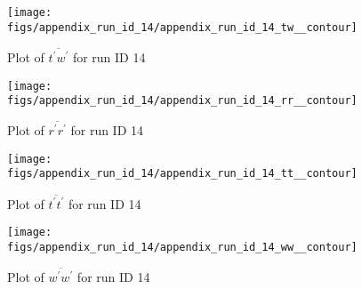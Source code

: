 \begin{figure}[H]
\centering
\texttt{[image: figs/appendix\_run\_id\_14/appendix\_run\_id\_14\_tw\_\_contour]}
\caption{Plot of $\overline{t^\prime w^\prime}$ for run ID 14}
\label{fig:appendix_run_id_14_tw__contour}
\end{figure}


\begin{figure}[H]
\centering
\texttt{[image: figs/appendix\_run\_id\_14/appendix\_run\_id\_14\_rr\_\_contour]}
\caption{Plot of $\overline{r^\prime r^\prime}$ for run ID 14}
\label{fig:appendix_run_id_14_rr__contour}
\end{figure}


\begin{figure}[H]
\centering
\texttt{[image: figs/appendix\_run\_id\_14/appendix\_run\_id\_14\_tt\_\_contour]}
\caption{Plot of $\overline{t^\prime t^\prime}$ for run ID 14}
\label{fig:appendix_run_id_14_tt__contour}
\end{figure}


\begin{figure}[H]
\centering
\texttt{[image: figs/appendix\_run\_id\_14/appendix\_run\_id\_14\_ww\_\_contour]}
\caption{Plot of $\overline{w^\prime w^\prime}$ for run ID 14}
\label{fig:appendix_run_id_14_ww__contour}
\end{figure}


